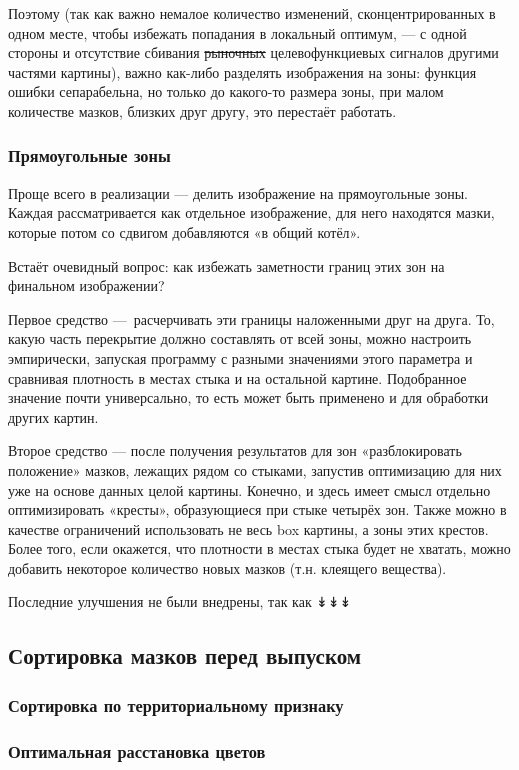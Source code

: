 Поэтому (так как важно немалое количество изменений, сконцентрированных в одном месте, чтобы избежать попадания в локальный оптимум, — с одной стороны
и отсутствие сбивания \sout{рыночных} целевофункциевых сигналов другими частями картины),
важно как-либо разделять изображения на зоны:
функция ошибки сепарабельна, но только до какого-то размера зоны, при малом количестве мазков, близких друг другу, это перестаёт работать.


\subsubsection{Прямоугольные зоны}
Проще всего в реализации — делить изображение на прямоугольные зоны.
Каждая рассматривается как отдельное изображение, для него находятся мазки, которые потом со сдвигом добавляются «в общий котёл».

Встаёт очевидный вопрос: как избежать заметности границ этих зон на финальном изображении?

Первое средство — расчерчивать эти границы наложенными друг на друга.
То, какую часть перекрытие должно составлять от всей зоны, можно настроить эмпирически, запуская программу с разными значениями этого параметра
и сравнивая плотность в местах стыка и на остальной картине.
Подобранное значение почти универсально, то есть может быть применено и для обработки других картин.

Второе средство — после получения результатов для зон «разблокировать положение» мазков, лежащих рядом со стыками,
запустив оптимизацию для них уже на основе данных целой картины.
Конечно, и здесь имеет смысл отдельно оптимизировать «кресты», образующиеся при стыке четырёх зон.
Также можно в качестве ограничений использовать не весь box картины, а зоны этих крестов.
Более того, если окажется, что плотности в местах стыка будет не хватать, можно добавить некоторое количество новых мазков (т.н. клеящего вещества).

Последние улучшения не были внедрены, так как ↡↡↡


\subsection{Сортировка мазков перед выпуском}\label{subsec:stroke_sorting}

\subsubsection{Сортировка по территориальному признаку}

\subsubsection{Оптимальная расстановка цветов}

